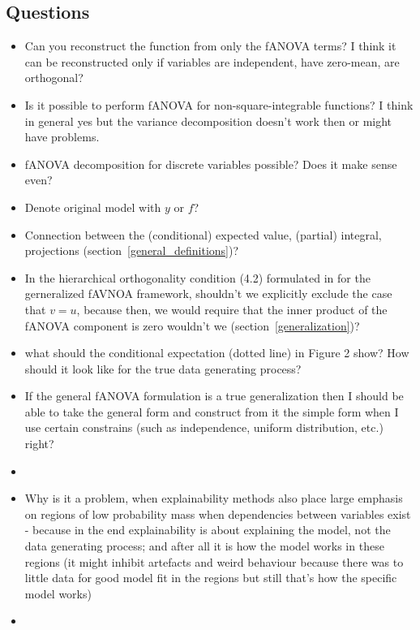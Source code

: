 

\subsection*{Questions}
\begin{itemize}
    \item Can you reconstruct the function from only the fANOVA terms? I think it can be reconstructed only if variables are independent, have zero-mean, are orthogonal?
    \item Is it possible to perform fANOVA for non-square-integrable functions? I think in general yes but the variance decomposition doesn't work then or might have problems.
    \item fANOVA decomposition for discrete variables possible? Does it make sense even?
    \item Denote original model with $y$ or $f$?
    \item Connection between the (conditional) expected value, (partial) integral, projections (section~\ref{general_definitions})?
    \item In the hierarchical orthogonality condition (4.2) formulated in \cite{hooker2007} for the gerneralized fAVNOA framework, shouldn't we explicitly exclude the case that $v = u$, because then, we would require that the inner product of the fANOVA component is zero wouldn't we (section~\ref{generalization})?
    \item \cite{hooker2007} what should the conditional expectation (dotted line) in Figure 2 show? How should it look like for the true data generating process?
    \item If the general fANOVA formulation is a true generalization then I should be able to take the general form and construct from it the simple form when I use certain constrains (such as independence, uniform distribution, etc.) right?
    \item \item Why is it a problem, when explainability methods also place large emphasis on regions of low probability mass when dependencies between variables exist - because in the end explainability is about explaining the model, not the data generating process; and after all it is how the model works in these regions (it might inhibit artefacts and weird behaviour because there was to little data for good model fit in the regions but still that's how the specific model works) 
    \item 

\end{itemize}
